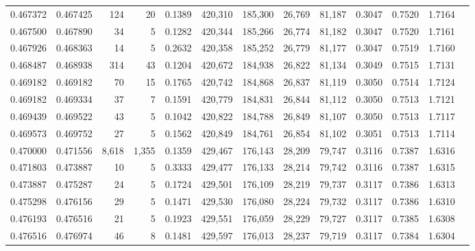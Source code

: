 \begin{tabular}{rrrrrrrrrrrrr}
0.467372 & 0.467425 &    124 &    20 &                                     0.1389 & 420,310 & 185,300 &  26,769 &  81,187 & 0.3047 & 0.7520 & 1.7164 \\
0.467500 & 0.467890 &     34 &     5 &                                     0.1282 & 420,344 & 185,266 &  26,774 &  81,182 & 0.3047 & 0.7520 & 1.7161 \\
0.467926 & 0.468363 &     14 &     5 &                                     0.2632 & 420,358 & 185,252 &  26,779 &  81,177 & 0.3047 & 0.7519 & 1.7160 \\
0.468487 & 0.468938 &    314 &    43 &                                     0.1204 & 420,672 & 184,938 &  26,822 &  81,134 & 0.3049 & 0.7515 & 1.7131 \\
0.469182 & 0.469182 &     70 &    15 &                                     0.1765 & 420,742 & 184,868 &  26,837 &  81,119 & 0.3050 & 0.7514 & 1.7124 \\
0.469182 & 0.469334 &     37 &     7 &                                     0.1591 & 420,779 & 184,831 &  26,844 &  81,112 & 0.3050 & 0.7513 & 1.7121 \\
0.469439 & 0.469522 &     43 &     5 &                                     0.1042 & 420,822 & 184,788 &  26,849 &  81,107 & 0.3050 & 0.7513 & 1.7117 \\
0.469573 & 0.469752 &     27 &     5 &                                     0.1562 & 420,849 & 184,761 &  26,854 &  81,102 & 0.3051 & 0.7513 & 1.7114 \\
0.470000 & 0.471556 &  8,618 & 1,355 &                                     0.1359 & 429,467 & 176,143 &  28,209 &  79,747 & 0.3116 & 0.7387 & 1.6316 \\
0.471803 & 0.473887 &     10 &     5 &                                     0.3333 & 429,477 & 176,133 &  28,214 &  79,742 & 0.3116 & 0.7387 & 1.6315 \\
0.473887 & 0.475287 &     24 &     5 &                                     0.1724 & 429,501 & 176,109 &  28,219 &  79,737 & 0.3117 & 0.7386 & 1.6313 \\
0.475298 & 0.476156 &     29 &     5 &                                     0.1471 & 429,530 & 176,080 &  28,224 &  79,732 & 0.3117 & 0.7386 & 1.6310 \\
0.476193 & 0.476516 &     21 &     5 &                                     0.1923 & 429,551 & 176,059 &  28,229 &  79,727 & 0.3117 & 0.7385 & 1.6308 \\
0.476516 & 0.476974 &     46 &     8 &                                     0.1481 & 429,597 & 176,013 &  28,237 &  79,719 & 0.3117 & 0.7384 & 1.6304 \\

\end{tabular}

